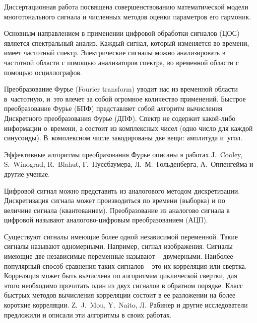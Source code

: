 {\actuality} 
Диссертационная работа посвящена совершенствованию математической модели многотонального сигнала и численных методов оценки параметров его гармоник. 

Основным направлением в применении цифровой обработки сигналов (ЦОС) является спектральный анализ. Каждый сигнал, который изменяется во времени, имеет частотный спектр. Электрические сигналы можно анализировать в частотной области с помощью анализаторов спектра, во временной области с помощью осциллографов. 

Преобразование Фурье (Fourier transform) уводит нас из временной области в частотную, и это влечет за собой огромное количество применений. Быстрое преобразование
Фурье (БПФ) представляет собой алгоритм вычисления Дискретного преобразования Фурье (ДПФ). Спектр не содержит какой-либо информации о времени, а состоит из комплексных чисел (одно число для каждой синусоиды). В комплексном числе закодированы две вещи: амплитуда и угол. 

Эффективные алгоритмы преобразования Фурье описаны в работах J.~Cooley, S.~Winograd, R.~Blahut, Г.~Нуссбаумера, Л.~М.~Гольденберга, А.~Оппенгейма и другие ученые. 


Цифровой сигнал можно представить из аналогового методом дискретизации. Дискретизация сигнала может производиться по времени (выборка) и по величине сигнала (квантованием). Преобразование из аналогово сигнала в цифровой называют аналогово-цифровым преобразованием (АЦП). 

Существуют сигналы имеющие более одной независимой переменной. Такие сигналы называют одномерными. Например, сигнал изображения. Сигналы имеющие две независимые переменные называют -- двумерными.
Наиболее популярный способ сравнения таких сигналов – это их корреляция или свертка. Корреляция может быть вычислена по алгоритмам циклической свертки, для этого необходимо прочитать один из двух сигналов в обратном порядке. Класс быстрых методов вычисления корреляции состоит в ее разложении на более короткие корреляции. Z.~J.~Mou, Y.~Naito, Л.~Рабинер и другие исследователи предложили и описали эти алгоритмы в своих работах.

